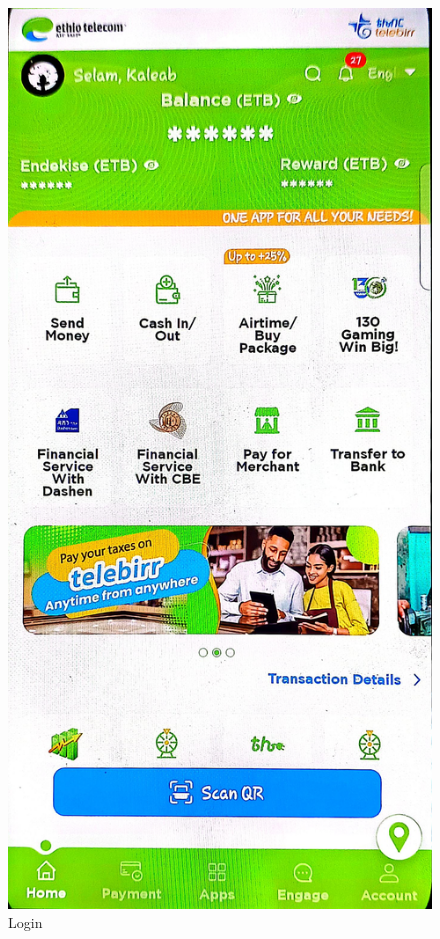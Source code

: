 \documentclass[a4paper,12pt]{report}
\begin{document}
\begin{figure}[h]
\begin{minipage}[b]{0.3\textwidth}
    \caption{Login}
  \end{minipage}
  \hfill
  \begin{minipage}[b]{0.3\textwidth}
    \includegraphics[width=\linewidth]{../images/screenshots/telebirr/telebirr_home.jpg}

\end{minipage}
\end{figure}
\end{document}
